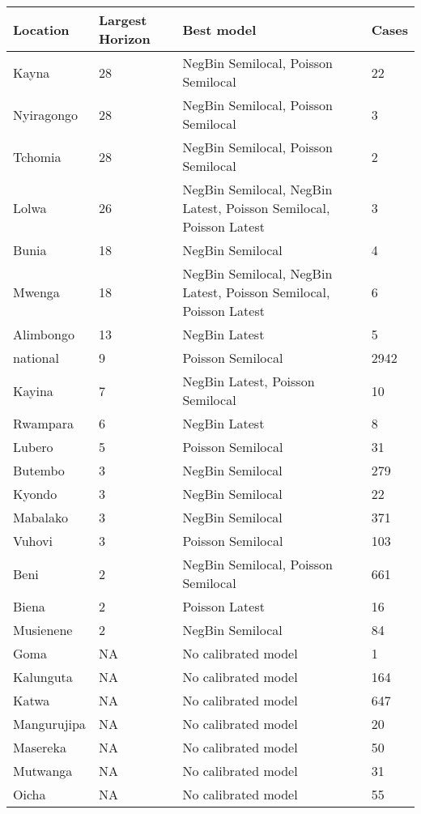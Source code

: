\begin{table}[ht]
\centering
\begin{tabular}{|l|l|p{8cm}|l|}
  \hline
Location & Largest Horizon & Best model & Cases \\ 
  \hline
Kayna & 28 & NegBin Semilocal, Poisson Semilocal & 22 \\ 
  Nyiragongo & 28 & NegBin Semilocal, Poisson Semilocal & 3 \\ 
  Tchomia & 28 & NegBin Semilocal, Poisson Semilocal & 2 \\ 
  Lolwa & 26 & NegBin Semilocal, NegBin Latest, Poisson Semilocal, Poisson Latest & 3 \\ 
  Bunia & 18 & NegBin Semilocal & 4 \\ 
  Mwenga & 18 & NegBin Semilocal, NegBin Latest, Poisson Semilocal, Poisson Latest & 6 \\ 
  Alimbongo & 13 & NegBin Latest & 5 \\ 
  national & 9 & Poisson Semilocal & 2942 \\ 
  Kayina & 7 & NegBin Latest, Poisson Semilocal & 10 \\ 
  Rwampara & 6 & NegBin Latest & 8 \\ 
  Lubero & 5 & Poisson Semilocal & 31 \\ 
  Butembo & 3 & NegBin Semilocal & 279 \\ 
  Kyondo & 3 & NegBin Semilocal & 22 \\ 
  Mabalako & 3 & NegBin Semilocal & 371 \\ 
  Vuhovi & 3 & Poisson Semilocal & 103 \\ 
  Beni & 2 & NegBin Semilocal, Poisson Semilocal & 661 \\ 
  Biena & 2 & Poisson Latest & 16 \\ 
  Musienene & 2 & NegBin Semilocal & 84 \\ 
  Goma & NA & No calibrated model & 1 \\ 
  Kalunguta & NA & No calibrated model & 164 \\ 
  Katwa & NA & No calibrated model & 647 \\ 
  Mangurujipa & NA & No calibrated model & 20 \\ 
  Masereka & NA & No calibrated model & 50 \\ 
  Mutwanga & NA & No calibrated model & 31 \\ 
  Oicha & NA & No calibrated model & 55 \\ 

\end{tabular}
\end{table}
